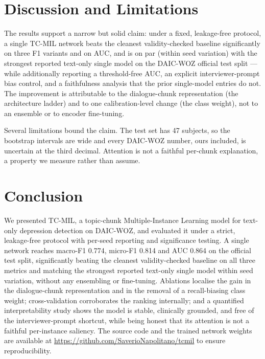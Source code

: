 \documentclass[conference]{IEEEtran}
\begin{document}
%



\section{Discussion and Limitations}

The results support a narrow but solid claim: under a fixed, leakage-free
protocol, a single TC-MIL network beats the cleanest validity-checked baseline
significantly on three F1 variants and on AUC, and is on par (within seed
variation) with the strongest reported text-only single model on the DAIC-WOZ
official test split --- while additionally reporting a threshold-free AUC, an
explicit interviewer-prompt bias control, and a faithfulness analysis that the
prior single-model entries do not. The improvement is attributable to the
dialogue-chunk representation (the architecture ladder) and to one
calibration-level change (the class weight), not to an ensemble or to encoder
fine-tuning.

Several limitations bound the claim. The test set has 47 subjects, so the
bootstrap intervals are wide and every DAIC-WOZ number, ours included, is
uncertain at the third decimal. Attention is not a faithful per-chunk
explanation, a property we measure rather than assume.

\section{Conclusion}

We presented TC-MIL, a topic-chunk Multiple-Instance Learning model for
text-only depression detection on DAIC-WOZ, and evaluated it under a strict,
leakage-free protocol with per-seed reporting and significance testing. A
single network reaches macro-F1 0.774, micro-F1 0.814 and AUC 0.864 on the
official test split, significantly beating the cleanest validity-checked
baseline on all three metrics and matching the strongest reported text-only
single model within seed variation, without any ensembling or fine-tuning. Ablations
localise the gain in the dialogue-chunk representation and in the removal of a
recall-biasing class weight; cross-validation corroborates the ranking
internally; and a quantified interpretability study shows the model is stable,
clinically grounded, and free of the interviewer-prompt shortcut, while being
honest that its attention is not a faithful per-instance saliency. The source
code and the trained network weights are available at
\url{https://github.com/SaverioNapolitano/tcmil} to ensure reproducibility.
\end{document}
